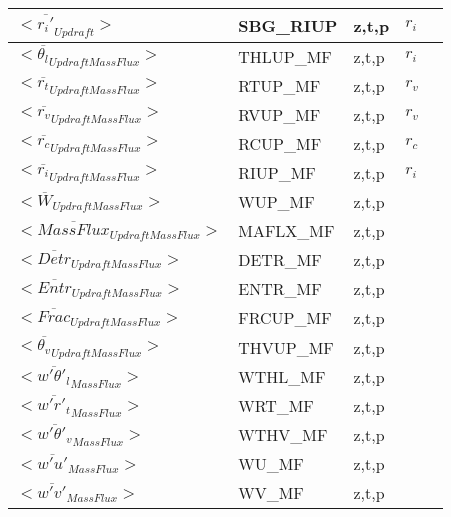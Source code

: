 \begin{center}
\begin{tabular}{||p{6cm}|>{\centering}p{2.5cm}|>{\centering}p{1.5cm}|>{\centering}p{0.5cm}|p{5cm }||}
\hline
$<\overline{r_i'}_{Updraft}>$ & SBG\_RIUP &z,t,p & $r_i$  & \\
\hline
$<\overline{\theta_l}_{Updraft Mass Flux}>$ & THLUP\_MF &z,t,p & $r_i$  & \\
\hline
$<\overline{r_t}_{Updraft Mass Flux}>$ & RTUP\_MF &z,t,p & $r_v$  & \\
\hline
$<\overline{r_v}_{Updraft Mass Flux}>$ & RVUP\_MF &z,t,p & $r_v$  & \\
\hline
$<\overline{r_c}_{Updraft Mass Flux}>$ & RCUP\_MF &z,t,p & $r_c$  & \\
\hline
$<\overline{r_i}_{Updraft Mass Flux}>$ & RIUP\_MF &z,t,p & $r_i$  & \\
\hline
$<\overline{W}_{Updraft Mass Flux}>$ & WUP\_MF &z,t,p & $   $  & \\
\hline
$<\overline{Mass Flux}_{Updraft Mass Flux}>$ & MAFLX\_MF &z,t,p & $   $  & \\
\hline
$<\overline{Detr}_{Updraft Mass Flux}>$ & DETR\_MF &z,t,p & $   $  & \\
\hline
$<\overline{Entr}_{Updraft Mass Flux}>$ & ENTR\_MF &z,t,p & $   $  & \\
\hline
$<\overline{Frac}_{Updraft Mass Flux}>$ & FRCUP\_MF &z,t,p & $   $  & \\
\hline
$<\overline{\theta_v}_{Updraft Mass Flux}>$ & THVUP\_MF &z,t,p & $   $  & \\
\hline
$<\overline{w'\theta'_l}_{Mass Flux}>$ & WTHL\_MF &z,t,p & $   $  & \\
\hline
$<\overline{w'r'_t}_{Mass Flux}>$ & WRT\_MF &z,t,p & $   $  & \\
\hline
$<\overline{w'\theta'_v}_{Mass Flux}>$ & WTHV\_MF &z,t,p & $   $  & \\
\hline
$<\overline{w'u'}_{Mass Flux}>$ & WU\_MF &z,t,p & $   $  & \\
\hline
$<\overline{w'v'}_{Mass Flux}>$ & WV\_MF &z,t,p & $   $  & \\
\hline
\hline
\end{tabular}
\end{center}

\newpage

